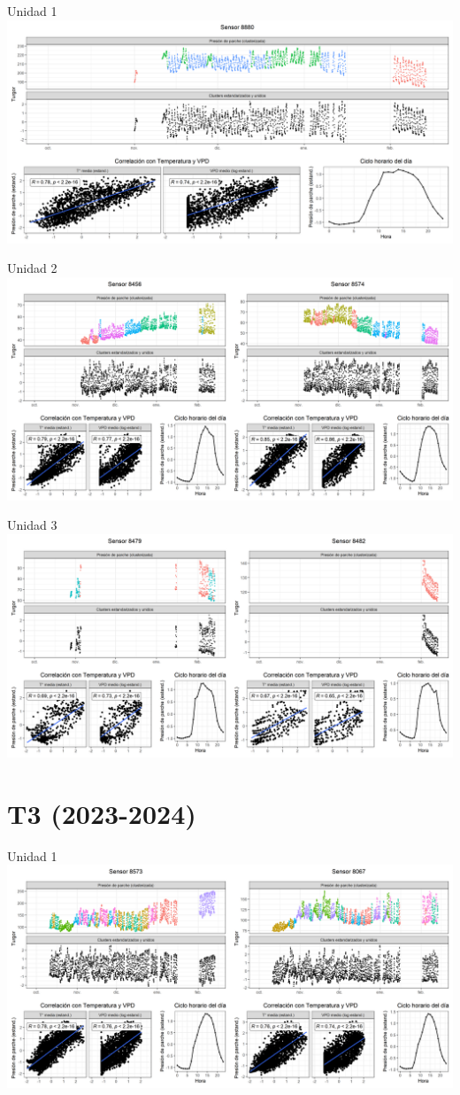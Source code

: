 \documentclass[
  letterpaper,
  DIV=11,
  numbers=noendperiod]{scrreprt}
\begin{document}
Unidad 1
\includegraphics{figuras/03_turgor_union/2023_2024_La_Esperanza_T2_Unidad_1.png}

Unidad 2
\includegraphics{figuras/03_turgor_union/2023_2024_La_Esperanza_T2_Unidad_2.png}

Unidad 3
\includegraphics{figuras/03_turgor_union/2023_2024_La_Esperanza_T2_Unidad_3.png}

\chapter{T3 (2023-2024)}

Unidad 1
\includegraphics{figuras/03_turgor_union/2023_2024_La_Esperanza_T3_Unidad_1.png}
\end{document}
